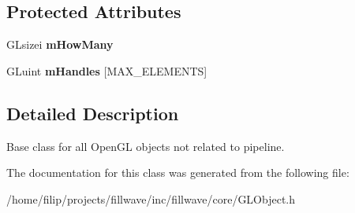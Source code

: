 \subsection*{Protected Attributes}
\begin{DoxyCompactItemize}
\item 
\mbox{\label{classflw_1_1flc_1_1GLObject_a295b5e3514f7b8f16cd0f9e73f3071f3}} 
G\+Lsizei {\bfseries m\+How\+Many}
\item 
\mbox{\label{classflw_1_1flc_1_1GLObject_a7a46e87fca26ddc35dc2ccb930b454f3}} 
G\+Luint {\bfseries m\+Handles} \mbox{[}M\+A\+X\+\_\+\+E\+L\+E\+M\+E\+N\+TS\mbox{]}
\end{DoxyCompactItemize}


\subsection{Detailed Description}
Base class for all Open\+GL objects not related to pipeline. 

The documentation for this class was generated from the following file\+:\begin{DoxyCompactItemize}
\item 
/home/filip/projects/fillwave/inc/fillwave/core/G\+L\+Object.\+h\end{DoxyCompactItemize}
